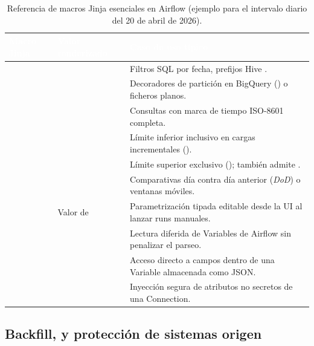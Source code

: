 \begin{table}[htbp]
\centering
\caption{Referencia de macros Jinja esenciales en Airflow (ejemplo para el intervalo diario del 20 de abril de 2026).}
\label{tab:jinja-macros}
\small
\begin{tabularx}{\textwidth}{@{}L{4.1cm} L{4.2cm} Y@{}}
\toprule
{}
\textcolor{white}{\sffamily\bfseries Macro Jinja} &
\textcolor{white}{\sffamily\bfseries Valor renderizado} &
\textcolor{white}{\sffamily\bfseries Caso de uso típico} \\
\midrule
{} &  & Filtros SQL por fecha, prefijos Hive . \\
 &  & Decoradores de partición en BigQuery () o ficheros planos. \\
 &  & Consultas con marca de tiempo ISO-8601 completa. \\
 &  & Límite inferior inclusivo en cargas incrementales (\code{>=}). \\
 &  & Límite superior exclusivo (\code{<}); también admite . \\
 &  & Comparativas día contra día anterior (\textit{DoD}) o ventanas móviles. \\
 & Valor de  & Parametrización tipada editable desde la UI al lanzar runs manuales. \\
 &  & Lectura diferida de Variables de Airflow sin penalizar el parseo. \\
 &  & Acceso directo a campos dentro de una Variable almacenada como JSON. \\
 &  & Inyección segura de atributos no secretos de una Connection. \\
\bottomrule
\end{tabularx}
\end{table}

\subsection{Backfill, \texorpdfstring{}{catchup} y protección de sistemas origen}

